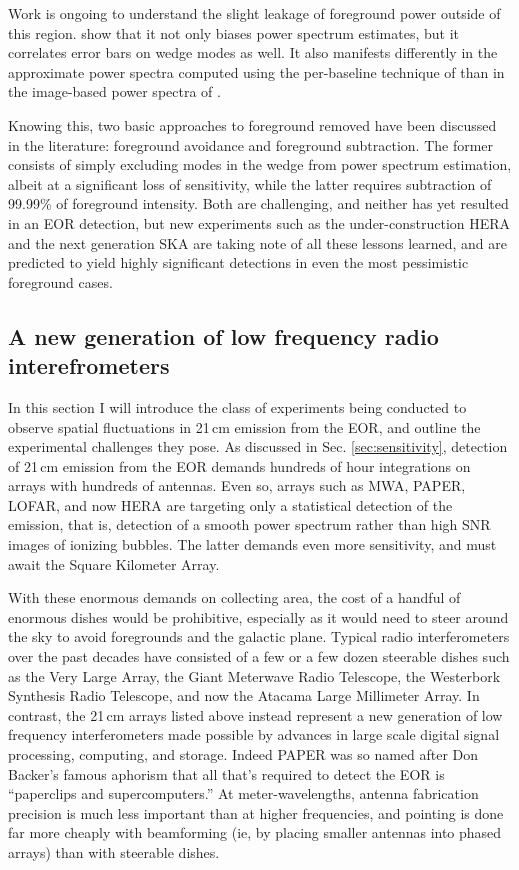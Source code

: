 {Work is ongoing to understand the slight leakage of foreground power outside of this region. \citet{AdrianWedge1,AdrianWedge2} show that it not only biases power spectrum estimates, but it correlates error bars on wedge modes as well. It also manifests differently \citep{pober13} in the approximate power spectra computed using the per-baseline technique of \citet{parsonsandbacker,parsons12b} than in the image-based power spectra of \citet{beardsley16,dillonneben,X13}. 

Knowing this, two basic approaches to foreground removed have been discussed in the literature: foreground avoidance and foreground subtraction. The former consists of simply excluding modes in the wedge from power spectrum estimation, albeit at a significant loss of sensitivity, while the latter requires subtraction of 99.99\% of foreground intensity. Both are challenging, and neither has yet resulted in an EOR detection, but new experiments such as the under-construction HERA \citep{neben16,ewallwice16,nithya16,deboer16,patra16} and the next generation SKA \citep{ska,ska1,ska2,ska3} are taking note of all these lessons learned, and are predicted to yield highly significant detections in even the most pessimistic foreground cases. 

\subsection{A new generation of low frequency radio interefrometers}

In this section I will introduce the class of experiments being conducted to observe spatial fluctuations in 21\,cm emission from the EOR, and outline the experimental challenges they pose. As discussed in Sec. \ref{sec:sensitivity}, detection of 21\,cm emission from the EOR demands hundreds of hour integrations on arrays with hundreds of antennas. Even so, arrays such as MWA, PAPER, LOFAR, and now HERA are targeting only a statistical detection of the emission, that is, detection of a smooth power spectrum rather than high SNR images of ionizing bubbles. The latter demands even more sensitivity, and must await the Square Kilometer Array.

With these enormous demands on collecting area, the cost of a handful of enormous dishes would be prohibitive, especially as it would need to steer around the sky to avoid foregrounds and the galactic plane. Typical radio interferometers over the past decades have consisted of a few or a few dozen steerable dishes such as the Very Large Array, the Giant Meterwave Radio Telescope, the Westerbork Synthesis Radio Telescope, and now the Atacama Large Millimeter Array. In contrast, the 21\,cm arrays listed above instead represent a new generation of low frequency interferometers made possible by advances in large scale digital signal processing, computing, and storage. Indeed PAPER was so named after Don Backer's famous aphorism that all that's required to detect the EOR is ``paperclips and supercomputers.'' At meter-wavelengths, antenna fabrication precision is much less important than at higher frequencies, and pointing is done far more cheaply with beamforming (ie, by placing smaller antennas into phased arrays) than with steerable dishes. 

}
